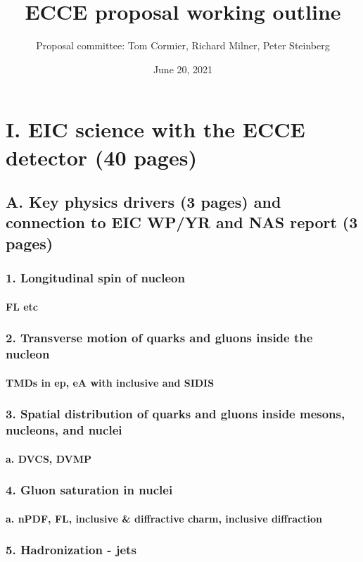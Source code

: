 \documentclass{report}
\title{\bf ECCE proposal working outline}
\author{Proposal committee: Tom Cormier, Richard Milner, Peter Steinberg}
\date{June 20, 2021}
\begin{document}
\maketitle
\setcounter{tocdepth}{5}
\tableofcontents
%
\chapter{I. EIC science with the ECCE detector (40 pages)}
%
\section{A. Key physics drivers (3 pages) and connection to EIC WP/YR and NAS report (3 pages)}
\subsection{1. Longitudinal spin of nucleon}
\subsubsection{FL etc}
\subsection{2. Transverse motion of quarks and gluons inside the nucleon}
\subsubsection{TMDs in ep, eA with inclusive and SIDIS}
\subsection{3. Spatial distribution of quarks and gluons inside mesons, nucleons, and nuclei}
\subsubsection{a. DVCS, DVMP}
\subsection{4. Gluon saturation in nuclei}
\subsubsection{a. nPDF, FL, inclusive \& diffractive charm, inclusive diffraction}
\subsection{5. Hadronization - jets}
%
\newpage
\end{document}
